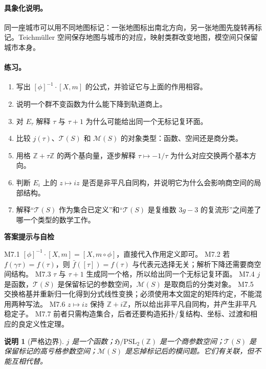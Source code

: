 \documentclass[UTF8,fontset=none,a4paper,11pt]{ctexart}
\theoremstyle{foundation-definition}
\theoremstyle{foundation-theorem}
\theoremstyle{foundation-proposition}
\theoremstyle{foundation-example}
\theoremstyle{foundation-remark}
\newtheorem{remark}[definition]{说明}
\theoremstyle{foundation-theorem}
\newcommand{\Z}{\mathbb Z}
\newcommand{\T}{\mathcal T}
\newcommand{\M}{\mathcal M}
\newenvironment{answerkey}{%
\begin{mdframed}[backgroundcolor=examplebg,linecolor=examplepurple,linewidth=1.0pt,
  leftline=true,rightline=false,topline=false,bottomline=false,
  skipabove=7pt,skipbelow=8pt,innerleftmargin=10pt,innerrightmargin=8pt,
  innertopmargin=6pt,innerbottommargin=6pt]
{\sffamily\bfseries\color{examplepurple}答案提示与自检}\par\smallskip\small
}{\end{mdframed}}
\begin{document}
\paragraph{具象化说明。}
同一座城市可以用不同地图标记：一张地图标出南北方向，另一张地图先旋转再标记。Teichmüller 空间保存地图与城市的对应，映射类群改变地图，模空间只保留城市本身。

\paragraph{练习。}
\begin{enumerate}[label=M7.\arabic*.]
  \item 写出 \([\phi]^{-1}\cdot[X,m]\) 的公式，并验证它与上面的作用相容。
  \item 说明一个群不变函数为什么能下降到轨道商上。
  \item 对 \(E_\tau\) 解释 \(\tau\) 与 \(\tau+1\) 为什么可能给出同一个无标记复环面。
  \item 比较 \(j(\tau)\)、\(\T(S)\) 和 \(\M(S)\) 的对象类型：函数、空间还是商分类。
  \item 用格 \(\mathbb Z+\tau\mathbb Z\) 的两个基向量，逐步解释 \(\tau\mapsto-1/\tau\) 为什么对应交换两个基本方向。
  \item 判断 \(E_i\) 上的 \(z\mapsto iz\) 是否是非平凡自同构，并说明它为什么会影响商空间的局部结构。
  \item 解释“\(\T(S)\) 作为集合已定义”和“\(\T(S)\) 是复维数 \(3g-3\) 的复流形”之间差了哪一个类型的数学工作。
\end{enumerate}

\begin{answerkey}
M7.1 \([\phi]^{-1}\cdot[X,m]=[X,m\circ\phi]\)，直接代入作用定义即可。
M7.2 若 \(f(\gamma\tau)=f(\tau)\)，则 \(\bar f([\tau])=f(\tau)\) 与代表元选择无关；解析下降还需要商空间结构。
M7.3 \(\tau\) 与 \(\tau+1\) 生成同一个格，所以给出同一个无标记复环面。
M7.4 \(j\) 是函数，\(\T(S)\) 是保留标记的参数空间，\(\M(S)\) 是取商后的分类对象。
M7.5 交换格基并重新归一化得到分式线性变换；必须使用本文固定的矩阵约定，不能混用两种写法。
M7.6 \(z\mapsto iz\) 保持 \(\mathbb Z+i\mathbb Z\)，所以给出非平凡自同构，并产生非平凡稳定子。
M7.7 前者只需构造集合，后者还要构造拓扑/复结构、坐标、过渡和相应的良定义性定理。
\end{answerkey}

\begin{remark}[严格边界]
\(j\) 是一个函数；\(\mathfrak H/\mathrm{PSL}_2(\Z)\) 是一个商参数空间；\(\T(S)\) 是保留标记的高亏格参数空间；\(\M(S)\) 是忘掉标记后的模问题。它们有关联，但不能互相代替。
\end{remark}
\end{document}
